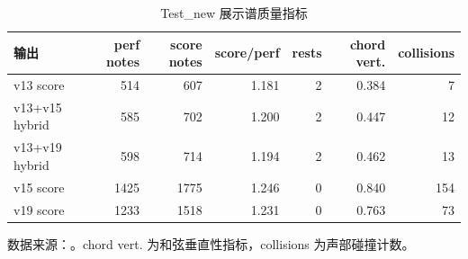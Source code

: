 \begin{table}[H]
\centering
\caption{Test\_new 展示谱质量指标}
\label{tab:demo_metrics}
\begin{tabular}{lrrrrrr}
\toprule
输出 & perf notes & score notes & score/perf & rests & chord vert. & collisions \\
\midrule
v13 score & 514 & 607 & 1.181 & 2 & 0.384 & 7 \\
v13+v15 hybrid & 585 & 702 & 1.200 & 2 & 0.447 & 12 \\
v13+v19 hybrid & 598 & 714 & 1.194 & 2 & 0.462 & 13 \\
v15 score & 1425 & 1775 & 1.246 & 0 & 0.840 & 154 \\
v19 score & 1233 & 1518 & 1.231 & 0 & 0.763 & 73 \\
\bottomrule
\end{tabular}

\vspace{2mm}
\footnotesize 数据来源：。chord vert. 为和弦垂直性指标，collisions 为声部碰撞计数。
\end{table}

